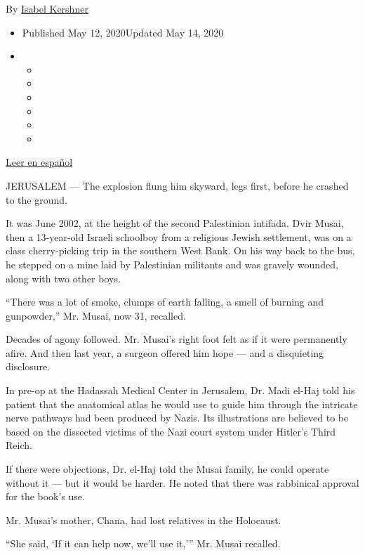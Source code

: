 By \href{https://www.nytimes3xbfgragh.onion/by/isabel-kershner}{Isabel
Kershner}

\begin{itemize}
\item
  Published May 12, 2020Updated May 14, 2020
\item
  \begin{itemize}
  \item
  \item
  \item
  \item
  \item
  \item
  \end{itemize}
\end{itemize}

\href{https://www.nytimes3xbfgragh.onion/es/2020/05/15/espanol/mundo/libro-nazi-israel-medicina.html}{Leer
en español}

JERUSALEM --- The explosion flung him skyward, legs first, before he
crashed to the ground.

It was June 2002, at the height of the second Palestinian intifada. Dvir
Musai, then a 13-year-old Israeli schoolboy from a religious Jewish
settlement, was on a class cherry-picking trip in the southern West
Bank. On his way back to the bus, he stepped on a mine laid by
Palestinian militants and was gravely wounded, along with two other
boys.

``There was a lot of smoke, clumps of earth falling, a smell of burning
and gunpowder,'' Mr. Musai, now 31, recalled.

Decades of agony followed. Mr. Musai's right foot felt as if it were
permanently afire. And then last year, a surgeon offered him hope ---
and a disquieting disclosure.

In pre-op at the Hadassah Medical Center in Jerusalem, Dr. Madi el-Haj
told his patient that the anatomical atlas he would use to guide him
through the intricate nerve pathways had been produced by Nazis. Its
illustrations are believed to be based on the dissected victims of the
Nazi court system under Hitler's Third Reich.

If there were objections, Dr. el-Haj told the Musai family, he could
operate without it --- but it would be harder. He noted that there was
rabbinical approval for the book's use.

Mr. Musai's mother, Chana, had lost relatives in the Holocaust.

``She said, `If it can help now, we'll use it,''' Mr. Musai recalled.

